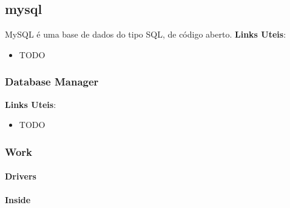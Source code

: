 \subsection{mysql}
MySQL é uma base de dados do tipo SQL, de código aberto.\newline
\textbf{Links Uteis}:
\begin{itemize}
\item TODO
\end{itemize}

\subsubsection{Database Manager}

\textbf{Links Uteis}:
\begin{itemize}
\item TODO
\end{itemize}

\subsubsection{Work}

\paragraph{Drivers}

\paragraph{Inside}
